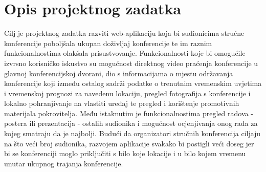 \chapter{Opis projektnog zadatka}
		
		
		

		Cilj je projektnog zadatka razviti web-aplikaciju koja bi sudionicima stručne konferencije poboljšala ukupan doživljaj konferencije te im raznim funkcionalnostima olakšala prisustvovanje. Funkcionalnosti koje bi omogućile izvrsno korisničko iskustvo su mogućnost direktnog video praćenja konferencije u glavnoj konferencijskoj dvorani, dio s informacijama o mjestu održavanja konferencije koji između ostalog sadrži podatke o trenutnim vremenskim uvjetima i vremenskoj prognozi za navedenu lokaciju, pregled fotografija s konferencije i lokalno pohranjivanje na vlastiti uređaj te pregled i korištenje promotivnih materijala pokrovitelja. Među istaknutim je funkcionalnostima pregled radova - postera ili prezentacija - ostalih sudionika i mogućnost ocjenjivanja onog rada za kojeg smatraju da je najbolji. Budući da organizatori stručnih konferencija ciljaju na što veći broj sudionika, razvojem aplikacije svakako bi postigli veći doseg jer bi se konferenciji moglo priključiti s bilo koje lokacije i u bilo kojem vremenu unutar ukupnog trajanja konferencije.\\
		
